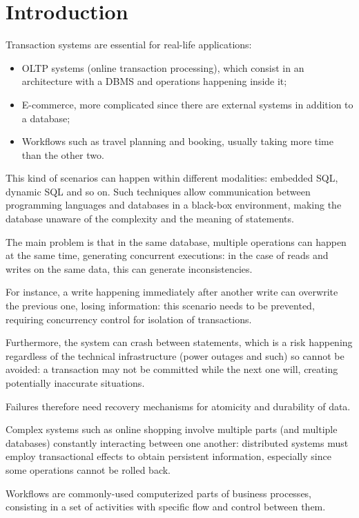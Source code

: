 \section{Introduction}
Transaction systems are essential for real-life applications: 
\begin{itemize}
	\item OLTP systems (online transaction processing), which consist in an architecture with a DBMS and operations happening inside it;
	\item E-commerce, more complicated since there are external systems in addition to a database;
	\item Workflows such as travel planning and booking, usually taking more time than the other two.
\end{itemize}

This kind of scenarios can happen within different modalities: embedded SQL, dynamic SQL and so on. Such techniques allow communication between programming languages and databases in a black-box environment, making the database unaware of the complexity and the meaning of statements. 

The main problem is that in the same database, multiple operations can happen at the same time, generating concurrent executions: in the case of reads and writes on the same data, this can generate inconsistencies.

For instance, a write happening immediately after another write can overwrite the previous one, losing information: this scenario needs to be prevented, requiring concurrency control for isolation of transactions.

Furthermore, the system can crash between statements, which is a risk happening regardless of the technical infrastructure (power outages and such) so cannot be avoided: a transaction may not be committed while the next one will, creating potentially inaccurate situations.

Failures therefore need recovery mechanisms for atomicity and durability of data. 

Complex systems such as online shopping involve multiple parts (and multiple databases) constantly interacting between one another: distributed systems must employ transactional effects to obtain persistent information, especially since some operations cannot be rolled back.

Workflows are commonly-used computerized parts of business processes, consisting in a set of activities with specific flow and control between them. 

